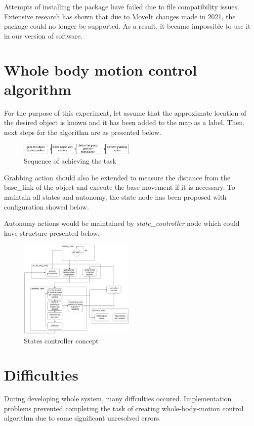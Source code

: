 \documentclass[conference,a4paper]{IEEEtran}
\begin{document}
Attempts of installing the package have failed due to file compatibility issues. Extensive research has shown that due to MoveIt changes made in 2021, the package could no longer be supported. As a result, it became impossible to use it in our version of software.

\section{Whole body motion control algorithm}
For the purpose of this experiment, let assume that the approximate location of the desired object is known and it has been added to the map as a label. Then, next steps for the algorithm are as presented below.

\begin{figure}[ht]
  \centering
  \includegraphics[width=0.5\textwidth]{img/algorithm_no_problem1.png}
  \caption{Sequence of achieving the task}
\end{figure}

Grabbing action should also be extended to measure the distance from the base\_link of the object and execute the base movement if it is necessary. To maintain all states and autonomy, the state node has been proposed with configuration showed below.

Autonomy actions would be maintained by \textit{state\_controller} node which could have structure presented below.
\begin{figure}[ht]
  \centering
  \includegraphics[width=0.5\textwidth]{img/states.png}
  \caption[states controller structure]{States controller concept}
\end{figure}
\FloatBarrier

\section{Difficulties}
During developing whole system, many diffculties occured. Implementation problems prevented completing the task of creating whole-body-motion control algorithm due to some significant unresolved errors.
\end{document}
